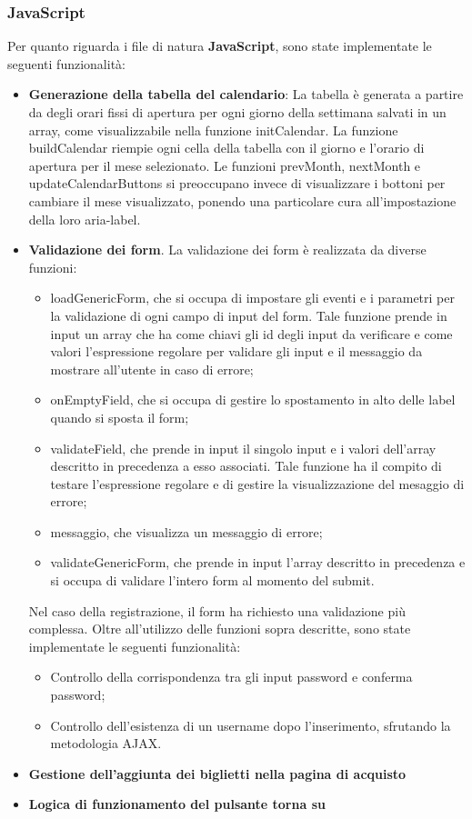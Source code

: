 \subsubsection{JavaScript}
Per quanto riguarda i file di natura \textbf{JavaScript}, sono state implementate le seguenti funzionalità:
\begin{itemize}
    \item \textbf{Generazione della tabella del calendario}:
        La tabella è generata a partire da degli orari fissi di apertura per ogni giorno della settimana salvati in un array, come visualizzabile nella funzione initCalendar. La funzione buildCalendar riempie ogni cella della tabella con il giorno e l'orario di apertura per il mese selezionato. Le funzioni prevMonth, nextMonth e updateCalendarButtons si preoccupano invece di visualizzare i bottoni per cambiare il mese visualizzato, ponendo una particolare cura all'impostazione della loro aria-label.
    \item \textbf{Validazione dei form}. La validazione dei form è realizzata da diverse funzioni:
    \begin{itemize}
        \item loadGenericForm, che si occupa di impostare gli eventi e i parametri per la validazione di ogni campo di input del form. Tale funzione prende in input un array che ha come chiavi gli id degli input da verificare e come valori l'espressione regolare per validare gli input e il messaggio da mostrare all'utente in caso di errore;
        \item onEmptyField, che si occupa di gestire lo spostamento in alto delle label quando si sposta il form;
        \item validateField, che prende in input il singolo input e i valori dell'array descritto in precedenza a esso associati. Tale funzione ha il compito di testare l'espressione regolare e di gestire la visualizzazione del mesaggio di errore;
        \item messaggio, che visualizza un messaggio di errore;
        \item validateGenericForm, che prende in input l'array descritto in precedenza e si 
        occupa di validare l'intero form al momento del submit.
    \end{itemize}
        Nel caso della registrazione, il form ha richiesto una validazione più complessa. Oltre all'utilizzo delle funzioni sopra descritte, sono state implementate le seguenti funzionalità:
        \begin{itemize}
            \item Controllo della corrispondenza tra gli input password e conferma password;
            \item Controllo dell'esistenza di un username dopo l'inserimento, sfrutando la metodologia AJAX.
        \end{itemize}
    
    \item \textbf{Gestione dell'aggiunta dei biglietti nella pagina di acquisto}
    \item \textbf{Logica di funzionamento del pulsante torna su}
\end{itemize}

